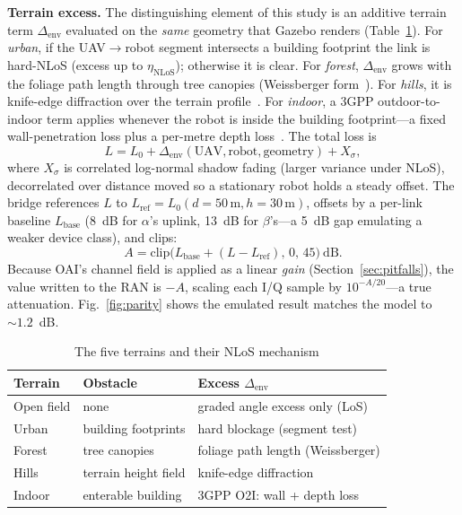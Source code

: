 \documentclass[10pt, conference]{IEEEtran}
\begin{document}
\textbf{Terrain excess.} The distinguishing element of this study is an additive
terrain term $\Delta_{\mathrm{env}}$ evaluated on the \emph{same} geometry that
Gazebo renders (Table~\ref{tab:terrain}). For \emph{urban}, if the UAV$\to$robot
segment intersects a building footprint the link is hard-NLoS (excess up to
$\eta_{\mathrm{NLoS}}$); otherwise it is clear. For \emph{forest},
$\Delta_{\mathrm{env}}$ grows with the foliage path length through tree canopies
(Weissberger form~\cite{weissberger1982}). For \emph{hills}, it is knife-edge
diffraction over the terrain profile~\cite{ituP526}. For \emph{indoor}, a 3GPP
outdoor-to-indoor term applies whenever the robot is inside the building
footprint---a fixed wall-penetration loss plus a per-metre depth
loss~\cite{3gpp38901}. The total loss is
\begin{equation}
L = L_0 + \Delta_{\mathrm{env}}(\text{UAV},\text{robot},\text{geometry}) + X_\sigma,
\end{equation}
where $X_\sigma$ is correlated log-normal shadow fading (larger variance under
NLoS), decorrelated over distance moved so a stationary robot holds a steady offset.
The bridge references $L$ to $L_{\mathrm{ref}}=L_0(d{=}50\,\mathrm{m},h{=}30\,\mathrm{m})$,
offsets by a per-link baseline $L_{\mathrm{base}}$ (8~dB for $\alpha$'s uplink,
13~dB for $\beta$'s---a 5~dB gap emulating a weaker device class), and clips:
\begin{equation}
A = \mathrm{clip}\big(L_{\mathrm{base}} + (L - L_{\mathrm{ref}}),\, 0,\, 45\big)\ \text{dB}.
\end{equation}
Because OAI's channel field is applied as a linear \emph{gain}
(Section~\ref{sec:pitfalls}), the value written to the RAN is $-A$, scaling each
I/Q sample by $10^{-A/20}$---a true attenuation. Fig.~\ref{fig:parity} shows the
emulated result matches the model to ${\sim}1.2$~dB.

\begin{table}[t]
\caption{The five terrains and their NLoS mechanism}
\label{tab:terrain}
\centering
\footnotesize
\begin{tabular}{@{}lll@{}}
\toprule
\textbf{Terrain} & \textbf{Obstacle} & \textbf{Excess $\Delta_{\mathrm{env}}$} \\
\midrule
Open field & none & graded angle excess only (LoS) \\
Urban & building footprints & hard blockage (segment test) \\
Forest & tree canopies & foliage path length (Weissberger) \\
Hills & terrain height field & knife-edge diffraction \\
Indoor & enterable building & 3GPP O2I: wall + depth loss \\
\bottomrule
\end{tabular}
\end{table}
\end{document}
